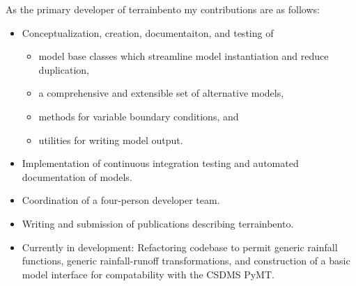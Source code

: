 \documentclass[10pt]{article}
\renewcommand{\section}[1]{\pagebreak[3]%
    \vspace{1.3\baselineskip}%
    \phantomsection\addcontentsline{toc}{section}{#1}%
    \noindent\llap{\large\scshape\smash{\parbox[t]{\marginparwidth}{\hyphenpenalty=10000\raggedright #1}}}%
    \vspace{-\baselineskip}\par}
\begin{document}
\begin{outerlist}
	As the primary developer of {\ttfamily terrainbento} my contributions are as follows:
	\begin{itemize}
		\item Conceptualization, creation, documentaiton, and testing of 
		\begin{itemize}
			\item model base classes which streamline model instantiation and reduce duplication, 
			\item a comprehensive and extensible set of alternative models,
			\item methods for variable boundary conditions, and
			\item utilities for writing model output.
		\end{itemize}
		\item Implementation of continuous integration testing and automated documentation of models. 
		\item Coordination of a four-person developer team. 
		\item Writing and submission of publications describing {\ttfamily terrainbento}.
		\item Currently in development: Refactoring codebase to permit generic rainfall functions, generic rainfall-runoff transformations, and construction of a basic model interface for compatability with the CSDMS PyMT.
	\end{itemize}
\end{outerlist}

\end{document}

